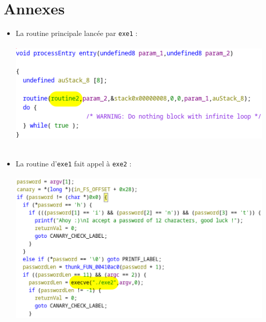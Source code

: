 \documentclass[12pt]{article}
\begin{document}
  \section{Annexes}
  \begin{itemize}
     \item La routine principale lancée par \texttt{exe1} : \\
    \\
  \includegraphics[scale=0.5]{"./0.png"}\\
  \\
  \item La routine d'\texttt{exe1} fait appel à \texttt{exe2} : \\
   \\
  \includegraphics[scale=0.3]{"./1.png"}
  
  \newpage
  

\end{itemize}
\end{document}
